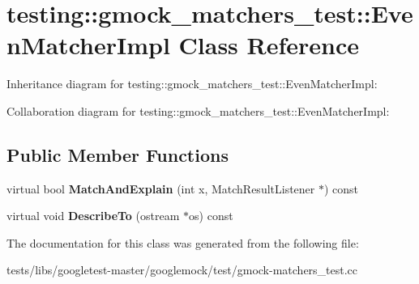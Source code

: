 \hypertarget{classtesting_1_1gmock__matchers__test_1_1EvenMatcherImpl}{}\section{testing\+:\+:gmock\+\_\+matchers\+\_\+test\+:\+:Even\+Matcher\+Impl Class Reference}
\label{classtesting_1_1gmock__matchers__test_1_1EvenMatcherImpl}


Inheritance diagram for testing\+:\+:gmock\+\_\+matchers\+\_\+test\+:\+:Even\+Matcher\+Impl\+:


Collaboration diagram for testing\+:\+:gmock\+\_\+matchers\+\_\+test\+:\+:Even\+Matcher\+Impl\+:
\subsection*{Public Member Functions}
\begin{DoxyCompactItemize}
\item 
\mbox{\label{classtesting_1_1gmock__matchers__test_1_1EvenMatcherImpl_a0ca990403daf3856cda897e4b1a02ae4}} 
virtual bool {\bfseries Match\+And\+Explain} (int x, Match\+Result\+Listener $\ast$) const
\item 
\mbox{\label{classtesting_1_1gmock__matchers__test_1_1EvenMatcherImpl_ae72d37964b4004dfa3a04d7b529ad2f9}} 
virtual void {\bfseries Describe\+To} (ostream $\ast$os) const
\end{DoxyCompactItemize}


The documentation for this class was generated from the following file\+:\begin{DoxyCompactItemize}
\item 
tests/libs/googletest-\/master/googlemock/test/gmock-\/matchers\+\_\+test.\+cc\end{DoxyCompactItemize}
